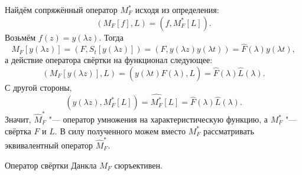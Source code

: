 \smallskip

Найдём сопряжённый оператор $M_F^*$ исходя из определения: $$(M_F[f],L)=(f,M_F^*[L]).$$ 
Возьмём $f(z)=y(\lambda z)$. Тогда 
$$M_F[y(\lambda z)]=(F,S_t[y(\lambda z)])=(F,y(\lambda z)y(\lambda t))=\hat F(\lambda)y(\lambda t),$$ 
а действие оператора свёртки на функционал следующее: 
$$(M_F[y(\lambda z)],L)=(y(\lambda t)\hat F(\lambda),L)=\hat F(\lambda)\hat L(\lambda).$$ 
С другой стороны, $$(y(\lambda z),M^*_F[L])=\widehat {M^*_F}[L]=\hat F(\lambda)\hat L(\lambda).$$ Значит, $\hat M^*_F$ "--- оператор умножения на характеристическую функцию, а $M^*_F$ "--- свёртка $F$ и $L$. В силу полученного можем вместо $M^*_F$ рассматривать эквивалентный оператор $\hat M^*_F$.

\smallskip

\begin{theorem}[2]Оператор свёртки Данкла $M_F$ сюръективен{\rm .}\end{theorem}

\smallskip

